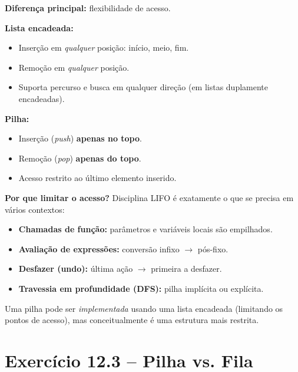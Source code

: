 \documentclass[12pt,a4paper]{article}
\begin{document}
\begin{respostabox}
\textbf{Diferença principal:} flexibilidade de acesso.

\textbf{Lista encadeada:}
\begin{itemize}[noitemsep]
  \item Inserção em \textit{qualquer} posição: início, meio, fim.
  \item Remoção em \textit{qualquer} posição.
  \item Suporta percurso e busca em qualquer direção (em listas duplamente
  encadeadas).
\end{itemize}

\textbf{Pilha:}
\begin{itemize}[noitemsep]
  \item Inserção (\textit{push}) \textbf{apenas no topo}.
  \item Remoção (\textit{pop}) \textbf{apenas do topo}.
  \item Acesso restrito ao último elemento inserido.
\end{itemize}

\textbf{Por que limitar o acesso?} Disciplina LIFO é exatamente o que se precisa
em vários contextos:
\begin{itemize}[noitemsep]
  \item \textbf{Chamadas de função:} parâmetros e variáveis locais são empilhados.
  \item \textbf{Avaliação de expressões:} conversão infixo $\to$ pós-fixo.
  \item \textbf{Desfazer (undo):} última ação $\to$ primeira a desfazer.
  \item \textbf{Travessia em profundidade (DFS):} pilha implícita ou explícita.
\end{itemize}

Uma pilha pode ser \textit{implementada} usando uma lista encadeada (limitando os
pontos de acesso), mas conceitualmente é uma estrutura mais restrita.
\end{respostabox}

\section{Exercício 12.3 -- Pilha vs. Fila}
\end{document}
